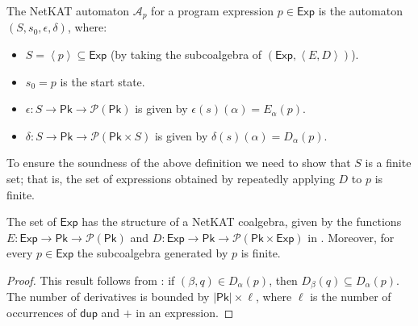 \documentclass[acmsmall,dvipsnames,nonacm]{acmart}
\newcommand\Pk{\mathsf{Pk}}
\newcommand\pk{\alpha}
\newcommand\pkp{\beta}
\newcommand\dup{\mathsf{dup}}
\newcommand\Exp{\mathsf{Exp}}
\newcommand\NetKAT{\textsf{NetKAT}\xspace}
\begin{document}
\begin{definition} The \NetKAT automaton $\mathcal A_p$ for a program expression $p\in\Exp$ is the automaton $(S, s_0, \epsilon, \delta)$, where:
\begin{itemize}
    \item $S = \left<p\right> \subseteq \Exp$ (by taking the subcoalgebra of $(\Exp, \left<E,D\right>)$).
    \item $s_0 = p$ is the start state.
    \item $\epsilon\colon S \to \Pk \to \mathcal{P}(\Pk)$ is given by $\epsilon(s)(\pk) = E_\pk(p)$.
        \item $\delta\colon S \to \Pk \to \mathcal{P}(\Pk \times S)$ is given by $\delta(s)(\pk) = D_\pk(p)$.
\end{itemize}
\end{definition}
To ensure the soundness of the above definition we need to show that $S$ is a finite set; that is, the set of expressions obtained by repeatedly applying $D$ to $p$ is finite.
\begin{theorem}
The set of $\Exp$ has the structure of a \NetKAT coalgebra, given by the functions $E\colon \Exp \to \Pk \to \mathcal{P}(\Pk)$ and $D \colon\Exp \to \Pk \to \mathcal{P}(\Pk \times \Exp)$ in . Moreover, for every $p\in\Exp$ the subcoalgebra generated by $p$ is finite. 
\end{theorem}
\begin{proof}
This result follows from : if $(\pkp, q) \in D_\pk(p)$, then $D_{\pkp}(q) \subseteq D_\pk(p)$. The number of derivatives is bounded by $|\Pk| \times \ell$, where $\ell$ is the number of occurrences of $\dup$ and $+$ in an expression. 
\end{proof}
\end{document}
